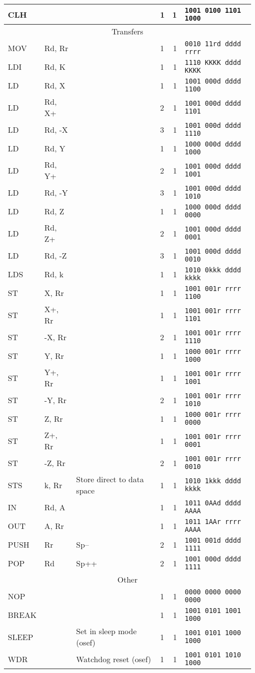 \documentclass[11pt]{article}
\begin{document}
\begin{center}
\begin{longtable}{|l|l| p{}|l|r|l|}
CLH &  &  & 1 & 1 & \texttt{1001 0100 1101 1000}\\
\hline\hline
\multicolumn{6}{|c|}{Transfers} \\
\hline
MOV & Rd, Rr &  & 1 & 1 & \texttt{0010 11rd dddd rrrr}\\
LDI & Rd, K &  & 1 & 1 & \texttt{1110 KKKK dddd KKKK}\\
LD & Rd, X &  & 1 & 1 & \texttt{1001 000d dddd 1100}\\
LD & Rd, X+ &  & 2 & 1 & \texttt{1001 000d dddd 1101}\\
LD & Rd, -X &  & 3 & 1 & \texttt{1001 000d dddd 1110}\\
LD & Rd, Y &  & 1 & 1 & \texttt{1000 000d dddd 1000}\\
LD & Rd, Y+ &  & 2 & 1 & \texttt{1001 000d dddd 1001}\\
LD & Rd, -Y &  & 3 & 1 & \texttt{1001 000d dddd 1010}\\
LD & Rd, Z &  & 1 & 1 & \texttt{1000 000d dddd 0000}\\
LD & Rd, Z+ &  & 2 & 1 & \texttt{1001 000d dddd 0001}\\
LD & Rd, -Z &  & 3 & 1 & \texttt{1001 000d dddd 0010}\\
LDS & Rd, k &  & 1 & 1 & \texttt{1010 0kkk dddd kkkk}\\
ST & X, Rr &  & 1 & 1 & \texttt{1001 001r rrrr 1100}\\
ST & X+, Rr &  & 1 & 1 & \texttt{1001 001r rrrr 1101}\\
ST & -X, Rr &  & 2 & 1 & \texttt{1001 001r rrrr 1110}\\
ST & Y, Rr &  & 1 & 1 & \texttt{1000 001r rrrr 1000}\\
ST & Y+, Rr &  & 1 & 1 & \texttt{1001 001r rrrr 1001}\\
ST & -Y, Rr &  & 2 & 1 & \texttt{1001 001r rrrr 1010}\\
ST & Z, Rr &  & 1 & 1 & \texttt{1000 001r rrrr 0000}\\
ST & Z+, Rr &  & 1 & 1 & \texttt{1001 001r rrrr 0001}\\
ST & -Z, Rr &  & 2 & 1 & \texttt{1001 001r rrrr 0010}\\
STS & k, Rr & Store direct to data space & 1 & 1 & \texttt{1010 1kkk dddd kkkk}\\
IN & Rd, A &  & 1 & 1 & \texttt{1011 0AAd dddd AAAA}\\
OUT & A, Rr &  & 1 & 1 & \texttt{1011 1AAr rrrr AAAA}\\
PUSH & Rr & Sp-- & 2 & 1 & \texttt{1001 001d dddd 1111}\\
POP & Rd & Sp++ & 2 & 1 & \texttt{1001 000d dddd 1111}\\
\hline\hline
\multicolumn{6}{|c|}{Other} \\
\hline
NOP &  &  & 1 & 1 & \texttt{0000 0000 0000 0000}\\
BREAK &  &  & 1 & 1 & \texttt{1001 0101 1001 1000}\\
SLEEP &  & Set in sleep mode (osef) & 1 & 1 & \texttt{1001 0101 1000 1000}\\
WDR &  & Watchdog reset (osef) & 1 & 1 & \texttt{1001 0101 1010 1000}\\
\hline
\end{longtable}
\end{center}
\end{document}

